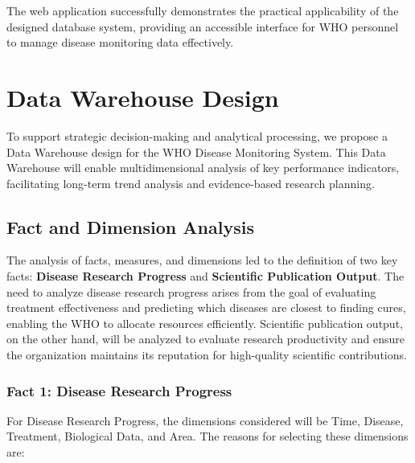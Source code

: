 \documentclass[11pt,a4paper]{article}
\begin{document}
The web application successfully demonstrates the practical applicability of the designed database system, providing an accessible interface for WHO personnel to manage disease monitoring data effectively.

\section{Data Warehouse Design}

To support strategic decision-making and analytical processing, we propose a Data Warehouse design for the WHO Disease Monitoring System. This Data Warehouse will enable multidimensional analysis of key performance indicators, facilitating long-term trend analysis and evidence-based research planning.

\subsection{Fact and Dimension Analysis}

The analysis of facts, measures, and dimensions led to the definition of two key facts: \textbf{Disease Research Progress} and \textbf{Scientific Publication Output}. The need to analyze disease research progress arises from the goal of evaluating treatment effectiveness and predicting which diseases are closest to finding cures, enabling the WHO to allocate resources efficiently. Scientific publication output, on the other hand, will be analyzed to evaluate research productivity and ensure the organization maintains its reputation for high-quality scientific contributions.

\subsubsection{Fact 1: Disease Research Progress}

For Disease Research Progress, the dimensions considered will be Time, Disease, Treatment, Biological Data, and Area. The reasons for selecting these dimensions are:
\end{document}
